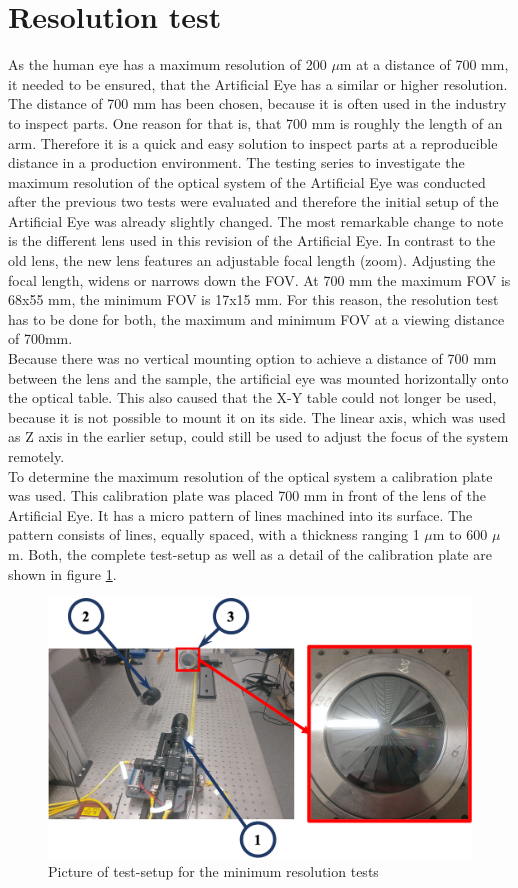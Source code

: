 \section{Resolution test}
As the human eye has a maximum resolution of 200 $\mu$m at a distance of 700 mm, it needed to be ensured, that the Artificial Eye has a similar or higher resolution. The distance of 700 mm has been chosen, because it is often used in the industry to inspect parts. One reason for that is, that 700 mm is roughly the length of an arm. Therefore it is a quick and easy solution to inspect parts at a reproducible distance in a production environment. The testing series to investigate the maximum resolution of the optical system of the Artificial Eye was conducted after the previous two tests were evaluated and therefore the initial setup of the Artificial Eye was already slightly changed. The most remarkable change to note is the different lens used in this revision of the Artificial Eye. In contrast to the old lens, the new lens features an adjustable focal length (zoom). Adjusting the focal length, widens or narrows down the FOV. At 700 mm the maximum FOV is 68x55 mm, the minimum FOV is 17x15 mm. For this reason, the resolution test has to be done for both, the maximum and minimum FOV at a viewing distance of 700mm.\\
Because there was no vertical mounting option to achieve a distance of 700 mm between the lens and the sample, the artificial eye was mounted horizontally onto the optical table. This also caused that the X-Y table could not longer be used, because it is not possible to mount it on its side. The linear axis, which was used as Z axis in the earlier setup, could still be used to adjust the focus of the system remotely.\\
To determine the maximum resolution of the optical system a calibration plate was used. This calibration plate was placed 700 mm in front of the lens of the Artificial Eye. It has a micro pattern of lines machined into its surface. The pattern consists of lines, equally spaced, with a thickness ranging 1 $\mu$m to 600 $\mu$m. Both, the complete test-setup as well as a detail of the calibration plate are shown in figure \ref{ResolutionSetup}.

\begin{figure}
\begin{center}
\includegraphics[width=12cm]{Pictures/ResolutionSetup}
\caption[Picture of test-setup for the minimum resolution tests]{Picture of test-setup for the minimum resolution tests}
\label{ResolutionSetup}
\end{center}
\end{figure}





